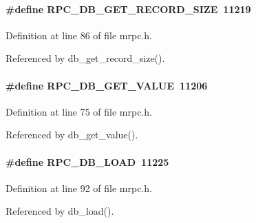 \paragraph[{RPC\_\-DB\_\-GET\_\-RECORD\_\-SIZE}]{\setlength{\rightskip}{0pt plus 5cm}\#define RPC\_\-DB\_\-GET\_\-RECORD\_\-SIZE~11219}\hfill\label{group__mrpcdefineh_gae9e1a4f5fcb9ebf0dbed23e1bb297a31}

\begin{DoxyItemize}
\item 
\end{DoxyItemize}

Definition at line 86 of file mrpc.h.

Referenced by db\_\-get\_\-record\_\-size().
\paragraph[{RPC\_\-DB\_\-GET\_\-VALUE}]{\setlength{\rightskip}{0pt plus 5cm}\#define RPC\_\-DB\_\-GET\_\-VALUE~11206}\hfill\label{group__mrpcdefineh_gaba365bffc385185187ea7b4f1b25c8b2}

\begin{DoxyItemize}
\item 
\end{DoxyItemize}

Definition at line 75 of file mrpc.h.

Referenced by db\_\-get\_\-value().
\paragraph[{RPC\_\-DB\_\-LOAD}]{\setlength{\rightskip}{0pt plus 5cm}\#define RPC\_\-DB\_\-LOAD~11225}\hfill\label{group__mrpcdefineh_ga0f99b5451f0d689532438b773b271d4f}

\begin{DoxyItemize}
\item 
\end{DoxyItemize}

Definition at line 92 of file mrpc.h.

Referenced by db\_\-load().
